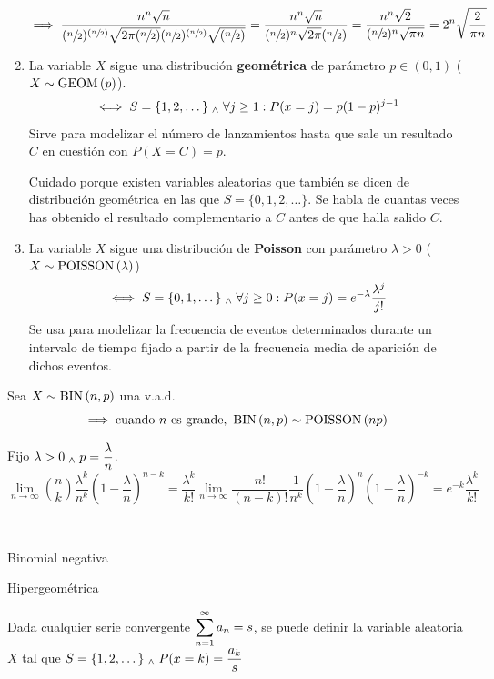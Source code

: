 \begin{ejem}
\begin{enumerate}
		      \[\implies \frac{n^n\sqrt{n}}{(\sfrac{n}{2})^{(\sfrac{n}{2})}\sqrt{2\pi (\sfrac{n}{2})}(\sfrac{n}{2})^{(\sfrac{n}       {2})}\sqrt{(\sfrac{n}{2})}} =
			      \frac{n^n\sqrt{n}}
			      {(\sfrac{n}{2})^{n}\sqrt{2\pi}(\sfrac{n}        {2})}=\frac{n^n\sqrt{2}}{(\sfrac{n}{2})^n\sqrt{\pi      n}}=2^n\sqrt{\frac{2}{\pi n}}\]
		\item La variable $X$ sigue una distribución \textbf{geométrica} de parámetro $p\in(0,1)$ ($X\sim\operatorname{GEOM}\left(p\right)$).
		      \[\iff S=\{1, 2, \dots\} \; _{\wedge} \; \forall j \geq 1 : P(x=j)=p(1-p)^{j-1}\]
		      Sirve para modelizar el número de lanzamientos hasta que sale un resultado $C$ en cuestión con $P(X=C)=p$. \vspace{-0.3cm}
		      \begin{obs}
			      Cuidado porque existen variables aleatorias que también se dicen de distribución geométrica en las que $S=\{0, 1, 2, \dots\}$. Se habla de cuantas veces has obtenido el resultado complementario a $C$ antes de que halla salido $C$.
		      \end{obs}
		\item La variable $X$ sigue una distribución de \textbf{Poisson} con parámetro $\lambda>0$ ($X\sim \operatorname{POISSON}\left(\lambda\right)$)
		      \[\iff S=\{0, 1, \dots\} \; _{\wedge} \; \forall j \geq 0 : P(x=j)=e^{-\lambda}\frac{\lambda^j}{j!}\]
		      Se usa para modelizar la frecuencia de eventos determinados durante un intervalo de tiempo fijado a partir de la frecuencia media de aparición de dichos eventos.
	\end{enumerate}
\end{ejem}

\begin{prop}
	Sea $X\sim \operatorname{BIN}\left(n, p\right)$ una v.a.d.
	\[\implies \text{cuando $n$ es grande, }\operatorname{BIN}\left(n, p\right)\sim\operatorname{POISSON}\left(np\right)\]
	\begin{dem}
		Fijo $\displaystyle\lambda>0 \; _{\wedge} \; p=\frac{\lambda}{n}$.
		\[\lim_{n\rightarrow\infty} \binom{n}{k}\frac{\lambda^k}{n^k}\left(1-\frac{\lambda}{n}\right)^{n-k}=\frac{\lambda^k}{k!}\lim_{n\rightarrow\infty} \frac{n!}{(n-k)!}\frac{1}{n^k}\left(1-\frac{\lambda}{n}\right)^n\left(1-\frac{\lambda}{n}\right)^{-k}=e^{-k}\frac{\lambda^k}{k!}\]

	\end{dem}
\end{prop}

\begin{ejem} \mbox{} \\
	\begin{itemize*}[itemjoin=\hspace{1cm}]
		\item Binomial negativa
		\item Hipergeométrica \\
		\item Dada cualquier serie convergente $\displaystyle \sum_{n=1}^\infty a_n = s$, se puede definir la variable aleatoria $X$ tal que $\displaystyle S=\{1, 2, \dots\} \; _{\wedge} \; P(x=k)=\frac{a_k}{s}$
	\end{itemize*}
\end{ejem}

